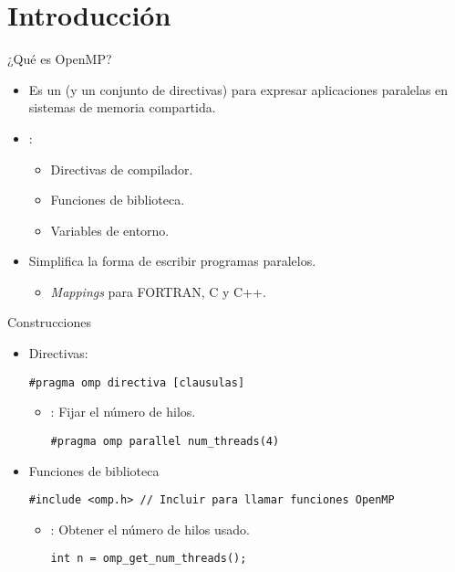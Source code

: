 \section{Introducción}

\begin{frame}[t]{¿Qué es OpenMP?}
\begin{itemize}
  \item Es un  (y un conjunto de directivas) para expresar aplicaciones
        paralelas en sistemas de memoria compartida.

  \item {}:
    \begin{itemize}
      \item Directivas de compilador.
      \item Funciones de biblioteca.
      \item Variables de entorno.
    \end{itemize}

  \item Simplifica la forma de escribir programas paralelos.
    \begin{itemize}
      \item \emph{Mappings} para FORTRAN, C y C++.
    \end{itemize}
\end{itemize}
\end{frame}

\begin{frame}[t,fragile]{Construcciones}
\begin{itemize}
  \item Directivas:
\begin{lstlisting}
#pragma omp directiva [clausulas]
\end{lstlisting}

  \begin{itemize}
    \item {}: Fijar el número de hilos.
\begin{lstlisting}
#pragma omp parallel num_threads(4)
\end{lstlisting}
  \end{itemize}

  \item Funciones de biblioteca
\begin{lstlisting}
#include <omp.h> // Incluir para llamar funciones OpenMP
\end{lstlisting}
    \begin{itemize}
      \item {}: Obtener el número de hilos usado.
\begin{lstlisting}
int n = omp_get_num_threads();
\end{lstlisting}
    \end{itemize}

\end{itemize}
\end{frame}

